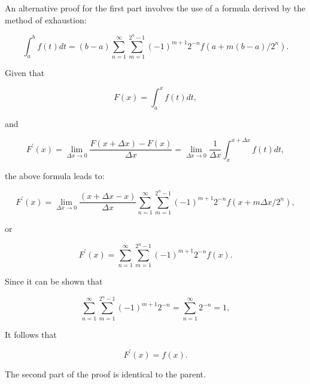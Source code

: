 \documentclass[12pt]{article}
\begin{document}
An alternative proof for the first part involves the use of a formula derived by the method of exhaustion:

\[
\int_{a}^{b}f(t)dt=\left(  b-a\right)  \sum_{n=1}^{\infty}\sum_{m=1}^{2^{n}
-1}\left(  -1\right)  ^{m+1}2^{-n}f\left(  a+m(b-a)/2^{n}\right)  .
\]


Given that

\[
F(x)=\int_{a}^{x}f(t)dt,
\]


and

\[
F^{\prime}(x)=\lim_{\Delta x\rightarrow0}\frac{F(x+\Delta x)-F(x)}{\Delta
x}=\lim_{\Delta x\rightarrow0}\frac{1}{\Delta x}\int_{x}^{x+\Delta x}f(t)dt,
\]


the above formula leads to:

\[
F^{\prime}(x)=\lim_{\Delta x\rightarrow0}\frac{(x+\Delta x-x)}{\Delta x}
\sum_{n=1}^{\infty}\sum_{m=1}^{2^{n}-1}\left(  -1\right)  ^{m+1}2^{-n}f\left(
x+m\Delta x/2^{n}\right)  ,
\]


or

\[
F^{\prime}(x)=\sum_{n=1}^{\infty}\sum_{m=1}^{2^{n}-1}\left(  -1\right)
^{m+1}2^{-n}f\left(  x\right)  .
\]


Since it can be shown that

\[
\sum_{n=1}^{\infty}\sum_{m=1}^{2^{n}-1}\left(  -1\right)  ^{m+1}2^{-n}
=\sum_{n=1}^{\infty}2^{-n}=1,
\]


It follows that

\[
F^{\prime}(x)=f(x).
\]


The second part of the proof is identical to the parent.

\end{document}

